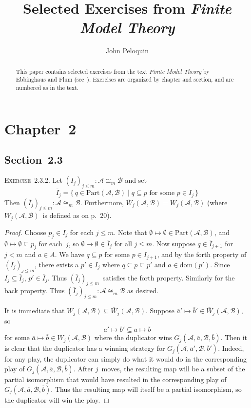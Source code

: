 \documentclass[letterpaper]{article}
\title{Selected Exercises from \emph{Finite Model Theory}}
\author{John Peloquin}
\newcommand{\A}{\mathcal{A}}
\newcommand{\B}{\mathcal{B}}
\newcommand{\dom}{\mathrm{dom}}
\newcommand{\pisos}{\mathrm{Part}}
\newcommand{\obar}[1]{\overline{#1}}
\newcommand{\iso}{\cong}
\newcommand{\bookchapter}[1]{\section*{Chapter~{#1}}}
\newcommand{\booksection}[1]{\subsection*{Section~{#1}}}
\newcommand{\exercise}[1]{\noindent\textsc{Exercise~{#1}.}}
\theoremstyle{plain}
\begin{document}
\maketitle
\begin{abstract}
This paper contains selected exercises from the text \emph{Finite Model Theory} by Ebbinghaus and Flum (see~\cite{ebbing99}). Exercises are organized by chapter and section, and are numbered as in the text.
\end{abstract}

\bookchapter{2}
\booksection{2.3}
\exercise{2.3.2}
Let $(I_j)_{j\le m}:\A\iso_m\B$ and set
$$\obar{I}_j=\{\,q\in\pisos(\A,\B)\mid\text{$q\subseteq p$ for some $p\in I_j$}\,\}$$
Then $(\obar{I}_j)_{j\le m}:\A\iso_m\B$. Furthermore, $\obar{W}_j(\A,\B)=W_j(\A,\B)$ (where $W_j(\A,\B)$~is defined as on p.~20).
\begin{proof}
Choose $p_j\in I_j$ for each $j\le m$. Note that $\emptyset\mapsto\emptyset\in\pisos(\A,\B)$, and $\emptyset\mapsto\emptyset\subseteq p_j$ for each~$j$, so $\emptyset\mapsto\emptyset\in\obar{I}_j$ for all $j\le m$. Now suppose $q\in\obar{I}_{j+1}$ for $j<m$ and $a\in A$. We have $q\subseteq p$ for some $p\in I_{j+1}$, and by the forth property of~$(I_j)_{j\le m}$, there exists a $p'\in I_j$ where $q\subseteq p\subseteq p'$ and $a\in\dom(p')$. Since $I_j\subseteq\obar{I}_j$, $p'\in\obar{I}_j$. Thus $(\obar{I}_j)_{j\le m}$~satisfies the forth property. Similarly for the back property. Thus $(\obar{I}_j)_{j\le m}:\A\iso_m\B$ as desired.

It is immediate that $W_j(\A,\B)\subseteq\obar{W}_j(\A,\B)$. Suppose $\obar{a}'\mapsto\obar{b}'\in\obar{W}_j(\A,\B)$, so
$$\obar{a}'\mapsto\obar{b}'\subseteq\obar{a}\mapsto\obar{b}$$
for some $\obar{a}\mapsto\obar{b}\in W_j(\A,\B)$ where the duplicator wins $G_j(\A,\obar{a},\B,\obar{b})$. Then it is clear that the duplicator has a winning strategy for $G_j(\A,\obar{a}',\B,\obar{b}')$. Indeed, for any play, the duplicator can simply do what it would do in the corresponding play of $G_j(\A,\obar{a},\B,\obar{b})$. After $j$~moves, the resulting map will be a subset of the partial isomorphism that would have resulted in the corresponding play of $G_j(\A,\obar{a},\B,\obar{b})$. Thus the resulting map will itself be a partial isomorphism, so the duplicator will win the play.
\end{proof}
\end{document}
